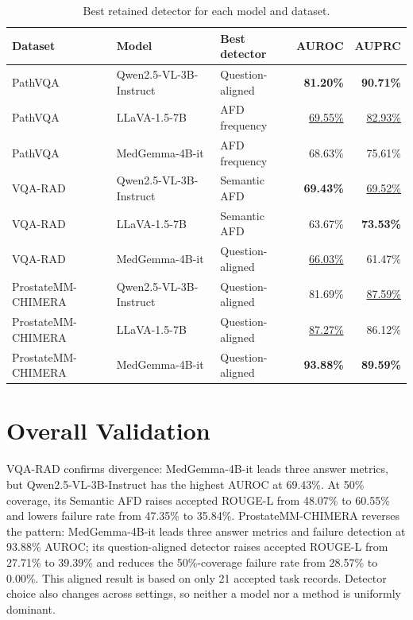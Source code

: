 \begin{table}[htbp]
    \centering
    \caption{Best retained detector for each model and dataset.}
    \label{tab:best-detector-all}
    \begin{tabularx}{\textwidth}{lXXrr}
        \toprule Dataset & Model & Best detector & AUROC & AUPRC \\ \midrule
        PathVQA & Qwen2.5-VL-3B-Instruct & Question-aligned & \textbf{81.20\%} & \textbf{90.71\%} \\
        PathVQA & LLaVA-1.5-7B & AFD frequency & \underline{69.55\%} & \underline{82.93\%} \\
        PathVQA & MedGemma-4B-it & AFD frequency & 68.63\% & 75.61\% \\ \midrule
        VQA-RAD & Qwen2.5-VL-3B-Instruct & Semantic AFD & \textbf{69.43\%} & \underline{69.52\%} \\
        VQA-RAD & LLaVA-1.5-7B & Semantic AFD & 63.67\% & \textbf{73.53\%} \\
        VQA-RAD & MedGemma-4B-it & Question-aligned & \underline{66.03\%} & 61.47\% \\ \midrule
        ProstateMM-CHIMERA & Qwen2.5-VL-3B-Instruct & Question-aligned & 81.69\% & \underline{87.59\%} \\
        ProstateMM-CHIMERA & LLaVA-1.5-7B & Question-aligned & \underline{87.27\%} & 86.12\% \\
        ProstateMM-CHIMERA & MedGemma-4B-it & Question-aligned & \textbf{93.88\%} & \textbf{89.59\%} \\ \bottomrule
    \end{tabularx}
\end{table}

\section{Overall Validation}

VQA-RAD confirms divergence: MedGemma-4B-it leads three answer metrics, but Qwen2.5-VL-3B-Instruct has the highest AUROC at 69.43\%. At 50\% coverage, its Semantic AFD raises accepted ROUGE-L from 48.07\% to 60.55\% and lowers failure rate from 47.35\% to 35.84\%. ProstateMM-CHIMERA reverses the pattern: MedGemma-4B-it leads three answer metrics and failure detection at 93.88\% AUROC; its question-aligned detector raises accepted ROUGE-L from 27.71\% to 39.39\% and reduces the 50\%-coverage failure rate from 28.57\% to 0.00\%. This aligned result is based on only 21 accepted task records. Detector choice also changes across settings, so neither a model nor a method is uniformly dominant.

